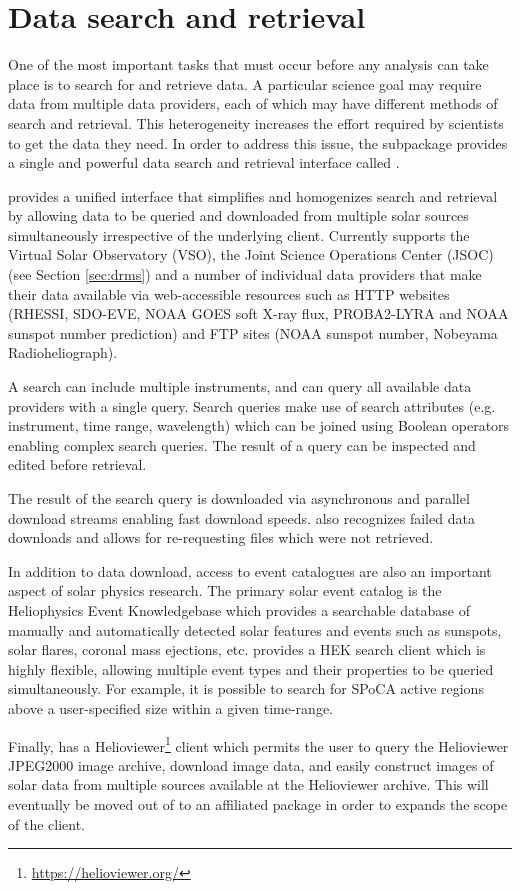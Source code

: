 \section{Data search and retrieval}
\label{sec:fido}

One of the most important tasks that must occur before any analysis can take place is to search for and retrieve data.
A particular science goal may require data from multiple data providers, each of which may have different methods of search and retrieval.
This heterogeneity increases the effort required by scientists to get the data they need.
In order to address this issue, the  subpackage provides a single and powerful data search and retrieval interface called \Fido.

\Fido provides a unified interface that simplifies and homogenizes search and retrieval by allowing data to be queried and downloaded from multiple solar sources simultaneously irrespective of the underlying client.
Currently \Fido supports the Virtual Solar Observatory (VSO), the Joint Science Operations Center (JSOC) (see Section \ref{sec:drms}) and a number of individual data providers that make their data available via web-accessible resources such as HTTP websites (RHESSI, SDO-EVE, NOAA GOES soft X-ray flux, PROBA2-LYRA and NOAA sunspot number prediction) and FTP sites (NOAA sunspot number, Nobeyama Radioheliograph).

A \Fido search can include multiple instruments, and can query all available data providers with a single query.
Search queries make use of search attributes (e.g. instrument, time range, wavelength) which can be joined using Boolean operators enabling complex search queries.
The result of a query can be inspected and edited before retrieval.

The result of the \Fido search query is downloaded via asynchronous and parallel download streams enabling fast download speeds.
\Fido also recognizes failed data downloads and allows for re-requesting files which were not retrieved.

In addition to data download, access to event catalogues are also an important aspect of solar physics research.
The primary solar event catalog is the Heliophysics Event Knowledgebase \citep[HEK,][]{hek} which provides a searchable database of manually and automatically detected solar features and events such as sunspots, solar flares, coronal mass ejections, etc. \sunpypkg provides a HEK search client which is highly flexible, allowing multiple event types and their properties to be queried simultaneously.
For example, it is possible to search for SPoCA \citep{2014AA...561A..29V} active regions above a user-specified size within a given time-range.

Finally, \sunpypkg has a Helioviewer\footnote{\url{https://helioviewer.org/}} client which permits the user to query the Helioviewer JPEG2000 image archive, download image data, and easily construct images of solar data from multiple sources available at the Helioviewer archive.
This will eventually be moved out of \sunpypkg to an affiliated package in order to expands the scope of the client.
